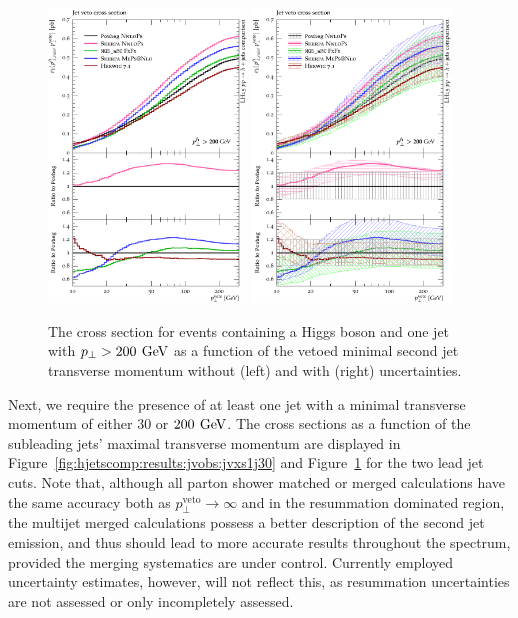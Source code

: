 \begin{figure}[t!]
  \centering
  \includegraphics[width=0.47\textwidth]{figures/hjetscomp_u_xs_jet_veto_j1_200.pdf}
  \hfill
  \includegraphics[width=0.47\textwidth]{figures/hjetscomp_xs_jet_veto_j1_200.pdf}
  \caption{
    The cross section for events containing a Higgs boson 
    and one jet with $p_\perp>200\,\text{\:GeV}$ as a function of
    the vetoed minimal second jet transverse momentum without
    (left) and with (right) uncertainties.
    \label{fig:hjetscomp:results:jvobs:jvxs1j200}
  }
\end{figure}

Next, we require the presence of at least one jet with 
a minimal transverse momentum of either $30$ or $200\,\text{\:GeV}$. 
The cross sections as a function of 
the subleading jets' maximal transverse momentum are displayed in 
Figure~\ref{fig:hjetscomp:results:jvobs:jvxs1j30} and 
Figure~\ref{fig:hjetscomp:results:jvobs:jvxs1j200} for the two lead jet cuts. 
Note that, although all parton 
shower matched or merged calculations have the same accuracy both as 
$p_\perp^\text{veto}\to\infty$ and in the resummation dominated region, 
the multijet merged calculations possess a better description of the 
second jet emission, and thus should lead to more accurate results 
throughout the spectrum, provided the merging systematics are under control. 
Currently employed uncertainty estimates, however, will not reflect this, 
as resummation uncertainties are not assessed or only incompletely assessed.

